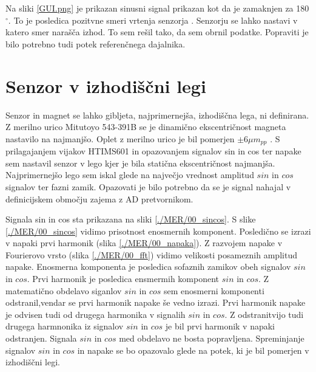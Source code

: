 Na sliki  \ref{GUI.png} je prikazan sinusni signal prikazan kot da je zamaknjen za 180$\mathrm{^\circ}$. To je posledica pozitvne smeri vrtenja senzorja \cite{RM44}. Senzorju se lahko nastavi v katero smer narašča izhod. To sem rešil tako, da sem obrnil podatke. Popraviti je bilo potrebno tudi potek referenčnega dajalnika.




\newpage
\section{Senzor v izhodiščni legi}

Senzor in magnet se lahko gibljeta, najprimernejša, izhodiščna lega, ni definirana. Z merilno urico Mitutoyo 543-391B se je dinamično ekscentričnost magneta nastavilo na najmanjšo. Oplet z merilno urico je bil pomerjen $\pm 6 \mu m_{pp}$ .
S prilagajanjem vijakov HTIMS601 in opazovanjem signalov sin in cos ter napake sem nastavil senzor v lego kjer je bila statična ekscentričnost najmanjša. Najprimernejšo lego sem iskal glede na največjo vrednost amplitud  $sin$ in $cos$ signalov ter fazni zamik. Opazovati je bilo potrebno  da se je signal nahajal v definicijskem območju zajema z AD pretvornikom.

Signala sin in cos sta prikazana na sliki \ref{./MER/00_sincos}.
S slike \ref{./MER/00_sincos} vidimo prisotnost enosmernih komponent. Posledično se izrazi v napaki prvi harmonik (slika \ref{./MER/00_napaka}).
Z razvojem napake v Fourierovo vrsto (slika \ref{./MER/00_fft}) vidimo velikosti posameznih amplitud napake. 
Enosmerna komponenta je posledica sofaznih zamikov obeh signalov $sin$ in $cos$. 
Prvi harmonik je posledica ensmermih komponent $sin$ in $cos$. Z matematično obdelavo siganlov $sin$ in $cos$ sem enosmerni komponenti odstranil,vendar se prvi harmonik napake še vedno izrazi. Prvi harmonik napake je odvisen tudi od drugega harmonika v signalih $sin$ in $cos$.
Z odstranitvijo tudi drugega harmnonika iz signalov $sin$ in $cos$ je bil  prvi harmonik v napaki odstranjen.
Signala  $sin$ in $cos$ med obdelavo ne bosta popravljena. Spreminjanje signalov  $sin$ in $cos$ in napake se bo opazovalo glede na potek, ki je bil pomerjen v izhodiščni legi.


